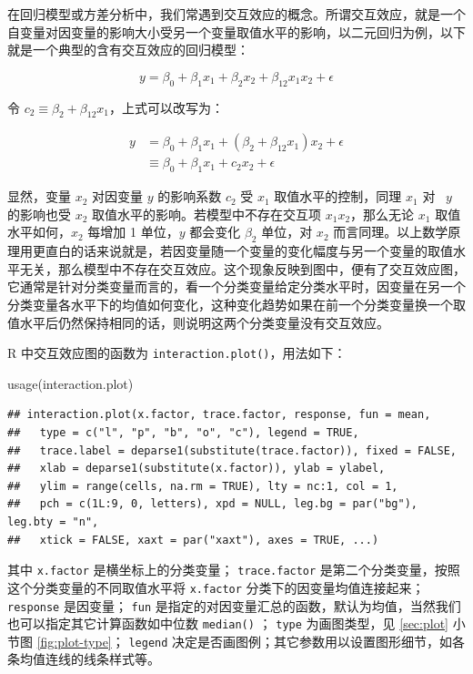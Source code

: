\documentclass[
  b5paper,
  UTF8,twoside]{book}
\newenvironment{Shaded}{\begin{snugshade}}{\end{snugshade}}
\newcommand{\FunctionTok}[1]{\textcolor[rgb]{0.00,0.00,0.00}{#1}}
\newcommand{\NormalTok}[1]{#1}
\begin{document}
在回归模型或方差分析中，我们常遇到交互效应的概念。所谓交互效应，就是一个自变量对因变量的影响大小受另一个变量取值水平的影响，以二元回归为例，以下就是一个典型的含有交互效应的回归模型：

\[y=\beta_{0}+\beta_{1}x_{1}+\beta_{2}x_{2}+\beta_{12}x_{1}x_{2}+\epsilon\]

令 \(c_{2}\equiv\beta_{2}+\beta_{12}x_{1}\)，上式可以改写为：

\[\begin{aligned}
y & =  \beta_{0}+\beta_{1}x_{1}+(\beta_{2}+\beta_{12}x_{1})x_{2}+\epsilon\\
 & \equiv  \beta_{0}+\beta_{1}x_{1}+c_{2}x_{2}+\epsilon\end{aligned}\]

显然，变量 \(x_{2}\) 对因变量 \(y\) 的影响系数 \(c_{2}\) 受 \(x_{1}\) 取值水平的控制，同理 \(x_{1}\) 对 ~\(y\) 的影响也受 \(x_{2}\) 取值水平的影响。若模型中不存在交互项 \(x_{1}x_{2}\)，那么无论 \(x_{1}\) 取值水平如何，\(x_{2}\) 每增加 1 单位，\(y\) 都会变化 \(\beta_{2}\) 单位，对 \(x_{2}\) 而言同理。以上数学原理用更直白的话来说就是，若因变量随一个变量的变化幅度与另一个变量的取值水平无关，那么模型中不存在交互效应。这个现象反映到图中，便有了交互效应图，它通常是针对分类变量而言的，看一个分类变量给定分类水平时，因变量在另一个分类变量各水平下的均值如何变化，这种变化趋势如果在前一个分类变量换一个取值水平后仍然保持相同的话，则说明这两个分类变量没有交互效应。

R 中交互效应图的函数为 \texttt{interaction.plot()}，用法如下：

\begin{Shaded}
\begin{Highlighting}[]
\FunctionTok{usage}\NormalTok{(interaction.plot)}
\end{Highlighting}
\end{Shaded}

\begin{verbatim}
## interaction.plot(x.factor, trace.factor, response, fun = mean,
##   type = c("l", "p", "b", "o", "c"), legend = TRUE,
##   trace.label = deparse1(substitute(trace.factor)), fixed = FALSE,
##   xlab = deparse1(substitute(x.factor)), ylab = ylabel,
##   ylim = range(cells, na.rm = TRUE), lty = nc:1, col = 1,
##   pch = c(1L:9, 0, letters), xpd = NULL, leg.bg = par("bg"), leg.bty = "n",
##   xtick = FALSE, xaxt = par("xaxt"), axes = TRUE, ...)
\end{verbatim}

其中 \texttt{x.factor} 是横坐标上的分类变量； \texttt{trace.factor} 是第二个分类变量，按照这个分类变量的不同取值水平将 \texttt{x.factor} 分类下的因变量均值连接起来； \texttt{response} 是因变量； \texttt{fun} 是指定的对因变量汇总的函数，默认为均值，当然我们也可以指定其它计算函数如中位数 \texttt{median()} ； \texttt{type} 为画图类型，见 \ref{sec:plot} 小节图 \ref{fig:plot-type}； \texttt{legend} 决定是否画图例；其它参数用以设置图形细节，如各条均值连线的线条样式等。
\end{document}
